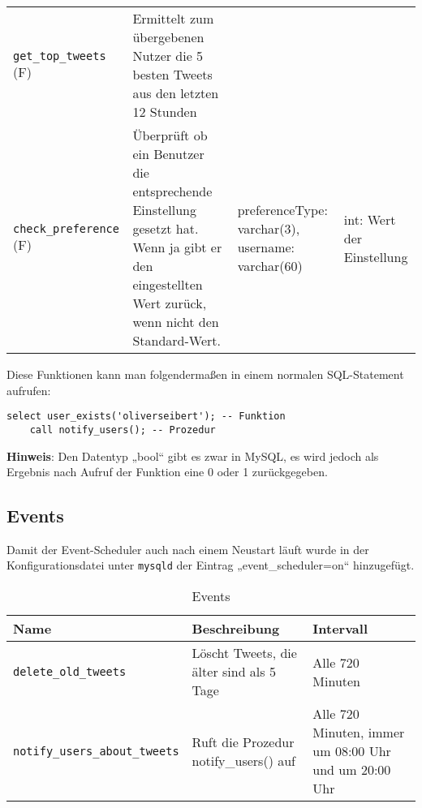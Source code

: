 \begin{table}[!ht]
\begin{tabular}{p{3.3cm}p{5.4cm}p{3.2cm}p{1.8cm}}
    \texttt{get\_top\_tweets} (F) & Ermittelt zum übergebenen Nutzer die 5 besten Tweets aus den letzten 12 Stunden & &  \\
    \texttt{check\_preference} (F) & Überprüft ob ein Benutzer die entsprechende Einstellung gesetzt hat. Wenn ja gibt er den eingestellten Wert zurück, wenn nicht den Standard-Wert.  & preferenceType: \newline varchar(3), \newline username: \newline varchar(60) & int: \newline Wert der \newline Einstellung \\
	\bottomrule
  \end{tabular}
\end{table}
\newpage
Diese Funktionen kann man folgendermaßen in einem normalen \acs{SQL}-Statement 
aufrufen:

\begin{lstlisting}[style=SQL]
	select user_exists('oliverseibert'); -- Funktion 
	call notify_users(); -- Prozedur
\end{lstlisting} 
\bigskip
\textbf{Hinweis}: Den Datentyp „bool“ gibt es zwar in MySQL, es wird jedoch als Ergebnis nach Aufruf der Funktion eine 0 oder 1 zurückgegeben.


\subsection{Events}

Damit der Event-Scheduler auch nach einem Neustart läuft wurde in der Konfigurationsdatei unter 
\texttt{mysqld} der Eintrag „event\_scheduler=on“ hinzugefügt.

\begin{table}[!ht]
\caption{Events}
  \begin{tabular}{p{4.8cm}p{4.4cm}p{4.6cm}}
    \toprule 
    \textbf{Name} & \textbf{Beschreibung} & \textbf{Intervall} \\
    \hline 
    \texttt{delete\_old\_tweets} & Löscht Tweets, die älter sind als 5 Tage & Alle 720 Minuten \\
    \texttt{notify\_users\_about\_tweets} & Ruft die Prozedur notify\_users() auf & Alle 720 Minuten, immer um 08:00 Uhr und um 20:00 Uhr \\
	\bottomrule
  \end{tabular}
\end{table}

